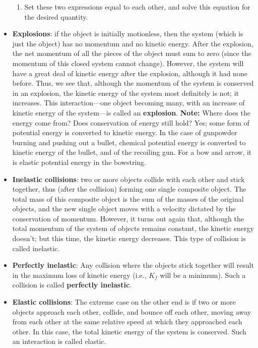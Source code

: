 \documentclass{report}
\begin{document}
\begin{itemize}
\begin{enumerate}
                \item Set these two expressions equal to each other, and solve this equation for the desired quantity.
            \end{enumerate}
        \item \textbf{Explosions}:
            if the object is initially motionless, then the system (which is just the object) has no momentum and no kinetic energy. After the explosion, the net momentum of all the pieces of the object must sum to zero (since the momentum of this closed system cannot change). However, the system will have a great deal of kinetic energy after the explosion, although it had none before. Thus, we see that, although the momentum of the system is conserved in an explosion, the kinetic energy of the system most definitely is not; it increases. This interaction—one object becoming many, with an increase of kinetic energy of the system—is called an \textbf{explosion}.
            \bigbreak \noindent 
            \textbf{Note:} Where does the energy come from? Does conservation of energy still hold? Yes; some form of potential energy is converted to kinetic energy. In the case of gunpowder burning and pushing out a bullet, chemical potential energy is converted to kinetic energy of the bullet, and of the recoiling gun. For a bow and arrow, it is elastic potential energy in the bowstring.
        \item \textbf{Inelastic collisions}:
            two or more objects collide with each other and stick together, thus (after the collision) forming one single composite object. The total mass of this composite object is the sum of the masses of the original objects, and the new single object moves with a velocity dictated by the conservation of momentum. However, it turns out again that, although the total momentum of the system of objects remains constant, the kinetic energy doesn’t; but this time, the kinetic energy decreases. This type of collision is called inelastic.
        \item \textbf{Perfectly inelastic}:
            Any collision where the objects stick together will result in the maximum loss of kinetic energy (i.e., $K_{f}$ will be a minimum). Such a collision is called \textbf{perfectly inelastic}.
        \item \textbf{Elastic collisions}:
            The extreme case on the other end is if two or more objects approach each other, collide, and bounce off each other, moving away from each other at the same relative speed at which they approached each other. In this case, the total kinetic energy of the system is conserved. Such an interaction is called elastic.

\end{itemize}
\end{document}
